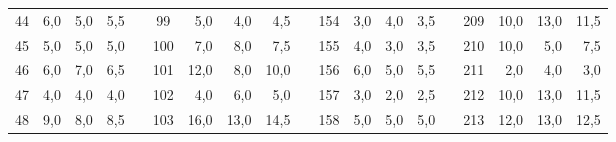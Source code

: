 \begin{table}[H]
{\begin{tabular}{|c|r|r|r|l|c|r|r|r|l|c|r|r|r|lcrrr}
44                                                    & 6,0                                                                       & 5,0                                                                       & 5,5                                                                       &  & 99  & 5,0  & 4,0  & 4,5  &  & 154 & 3,0  & 4,0  & 3,5  & \multicolumn{1}{l|}{} & \multicolumn{1}{c|}{209} & \multicolumn{1}{r|}{10,0} & \multicolumn{1}{r|}{13,0} & \multicolumn{1}{r|}{11,5} \\ \cline{1-4} \cline{6-9} \cline{11-14} \cline{16-19} 
45                                                    & 5,0                                                                       & 5,0                                                                       & 5,0                                                                       &  & 100 & 7,0  & 8,0  & 7,5  &  & 155 & 4,0  & 3,0  & 3,5  & \multicolumn{1}{l|}{} & \multicolumn{1}{c|}{210} & \multicolumn{1}{r|}{10,0} & \multicolumn{1}{r|}{5,0}  & \multicolumn{1}{r|}{7,5}  \\ \cline{1-4} \cline{6-9} \cline{11-14} \cline{16-19} 
46                                                    & 6,0                                                                       & 7,0                                                                       & 6,5                                                                       &  & 101 & 12,0 & 8,0  & 10,0 &  & 156 & 6,0  & 5,0  & 5,5  & \multicolumn{1}{l|}{} & \multicolumn{1}{c|}{211} & \multicolumn{1}{r|}{2,0}  & \multicolumn{1}{r|}{4,0}  & \multicolumn{1}{r|}{3,0}  \\ \cline{1-4} \cline{6-9} \cline{11-14} \cline{16-19} 
47                                                    & 4,0                                                                       & 4,0                                                                       & 4,0                                                                       &  & 102 & 4,0  & 6,0  & 5,0  &  & 157 & 3,0  & 2,0  & 2,5  & \multicolumn{1}{l|}{} & \multicolumn{1}{c|}{212} & \multicolumn{1}{r|}{10,0} & \multicolumn{1}{r|}{13,0} & \multicolumn{1}{r|}{11,5} \\ \cline{1-4} \cline{6-9} \cline{11-14} \cline{16-19} 
48                                                    & 9,0                                                                       & 8,0                                                                       & 8,5                                                                       &  & 103 & 16,0 & 13,0 & 14,5 &  & 158 & 5,0  & 5,0  & 5,0  & \multicolumn{1}{l|}{} & \multicolumn{1}{c|}{213} & \multicolumn{1}{r|}{12,0} & \multicolumn{1}{r|}{13,0} & \multicolumn{1}{r|}{12,5} \\ \cline{1-4} \cline{6-9} \cline{11-14} \cline{16-19} 

\end{tabular}}
\end{table}
